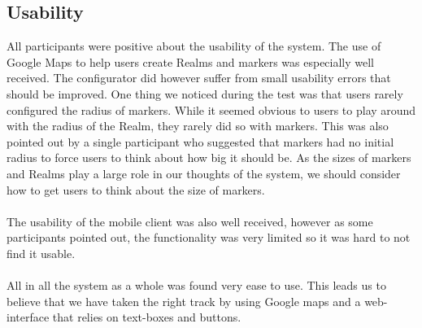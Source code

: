 \subsection{Usability} %
\label{sub:usability}
All participants were positive about the usability of the system. The use of Google Maps to help users create Realms and markers was especially well received. The configurator did however suffer from small usability errors that should be improved. One thing we noticed during the test was that users rarely configured the radius of markers. While it seemed obvious to users to play around with the radius of the Realm, they rarely did so with markers. This was also pointed out by a single participant who suggested that markers had no initial radius to force users to think about how big it should be. As the sizes of markers and Realms play a large role in our thoughts of the system, we should consider how to get users to think about the size of markers.
\\\\
The usability of the mobile client was also well received, however as some participants pointed out, the functionality was very limited so it was hard to not find it usable.
\\\\
All in all the system as a whole was found very ease to use. This leads us to believe that we have taken the right track by using Google maps and a web-interface that relies on text-boxes and buttons.

